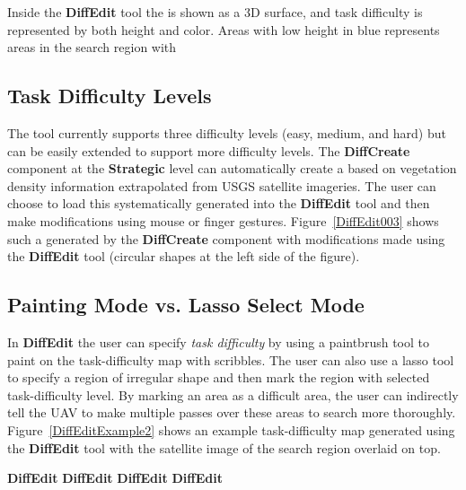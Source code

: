 Inside the \textbf{DiffEdit} tool the  is shown as a 3D surface, and task difficulty is represented by both height and color. Areas with low height in blue represents areas in the search region with 


\subsection{Task Difficulty Levels}

The tool currently supports three difficulty levels (easy, medium, and hard) but can be easily extended to support more difficulty levels. The \textbf{DiffCreate} component at the \textbf{Strategic} level can automatically create a  based on vegetation density information extrapolated from USGS satellite imageries. The user can choose to load this systematically generated  into the \textbf{DiffEdit} tool and then make modifications using mouse or finger gestures. Figure~\ref{DiffEdit003} shows such a  generated by the \textbf{DiffCreate} component with modifications made using the \textbf{DiffEdit} tool (circular shapes at the left side of the figure). 


\subsection{Painting Mode vs. Lasso Select Mode}


In \textbf{DiffEdit} the user can specify \textit{task difficulty} by using a paintbrush tool to paint on the task-difficulty map with scribbles. The user can also use a lasso tool to specify a region of irregular shape and then mark the region with selected task-difficulty level. By marking an area as a difficult area, the user can indirectly tell the UAV to make multiple passes over these areas to search more thoroughly. Figure~\ref{DiffEditExample2} shows an example task-difficulty map generated using the \textbf{DiffEdit} tool with the satellite image of the search region overlaid on top.





\textbf{DiffEdit}
\textbf{DiffEdit}
\textbf{DiffEdit}
\textbf{DiffEdit}




